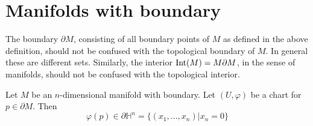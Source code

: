 \section{Manifolds with boundary}

	\begin{remark}
		The boundary $\partial M$, consisting of all boundary points of $M$ as defined in the above definition, should not be confused with the topological boundary of $M$. In general these are different sets. Similarly, the interior $\text{Int}(M) = M \\ \partial M$, in the sense of manifolds, should not be confused with the topological interior.
	\end{remark}
	
	\begin{property}
		Let $M$ be an $n$-dimensional manifold with boundary. Let $(U, \varphi)$ be a chart for $p\in\partial M$. Then
		\begin{equation}
			\varphi(p) \in \partial\mathbb{H}^n = \{(x_1, ..., x_n)|x_n=0\}
		\end{equation}
	\end{property}
